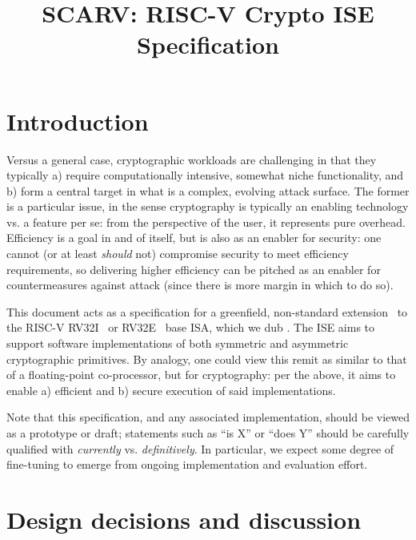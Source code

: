 \documentclass{article}
\title{SCARV: RISC-V Crypto ISE \\ Specification}
\begin{document}
\maketitle

\tableofcontents


\section{Introduction}

Versus a general case, cryptographic workloads are challenging in that they
typically
a) require computationally intensive, somewhat niche functionality,
   and
b) form a central target in what is a complex, evolving attack surface.
The former is a particular issue, in the sense cryptography is typically an
enabling technology vs. a feature per se: from the perspective of the user,
it represents pure overhead.  Efficiency is a goal in and of itself, but is
also as an enabler for security: one cannot (or at least {\em should} not)
compromise security to meet efficiency requirements, so delivering higher
efficiency can be pitched as an enabler for countermeasures against attack
(since there is more margin in which to do so).

This document acts as a specification for a 
greenfield, non-standard extension~\cite[Section 21.1]{SCARV:RV:ISA:I:17} 
to the RISC-V 
RV32I~\cite[Section 2]{SCARV:RV:ISA:I:17}
or
RV32E~\cite[Section 3]{SCARV:RV:ISA:I:17}
base 
ISA, which we dub \ISE.
The \ISE ISE aims to support software implementations of both symmetric and 
asymmetric cryptographic primitives.  By analogy, one could view this remit
as similar to that of a floating-point co-processor, but for cryptography: 
per the above, it aims to enable
a) efficient
   and
b) secure
execution of said implementations.

Note that this specification, and any associated implementation, should be
viewed as a prototype or draft; statements such as 
``\ISE is   X'' 
or
``\ISE does Y''
should be carefully qualified with {\em currently} vs. {\em definitively}.  
In particular, we expect some degree of fine-tuning to emerge from ongoing
implementation and evaluation effort.


\section{Design decisions and discussion}
\end{document}
